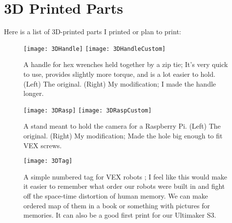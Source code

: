 \section{3D Printed Parts}
Here is a list of 3D-printed parts I printed or plan to print:

\begin{figure}[h]
    \centering
    \texttt{[image: 3DHandle]}
    \texttt{[image: 3DHandleCustom]}
    \caption{
        A handle for hex wrenches held together by a zip tie; It's very quick to use, provides slightly more torque, and is a lot easier to hold. (Left) The original. \cite{3DHandle} (Right) My modification; I made the handle longer.
    }
\end{figure}


\begin{figure}[h]
    \centering
    \texttt{[image: 3DRasp]}
    \texttt{[image: 3DRaspCustom]}
    \caption{
        A stand meant to hold the camera for a Raspberry Pi. (Left) The original. \cite{3DRasp} (Right) My modification; Made the hole big enough to fit VEX screws.
    }
\end{figure}

\begin{figure}[h]
    \centering
    \texttt{[image: 3DTag]}
    \caption{
        A simple numbered tag for VEX robots \cite{3DTag}; I feel like this would make it easier to remember what order our robots were built in and fight off the space-time distortion of human memory. We can make ordered map of them in a book or something with pictures for memories. It can also be a good first print for our Ultimaker S3.
    }
\end{figure}
